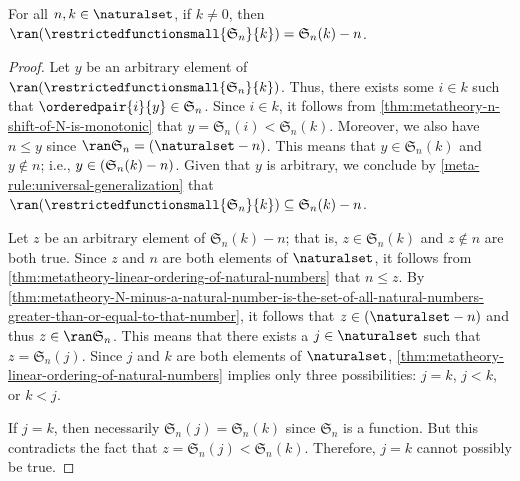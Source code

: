 \begin{thm}
     \label{thm:metatheory-the-range-of-restricted-n-shift}
    For all \( n, k \in \naturalset \), if \( k \neq 0 \), then \( \ran \mleft(  \restrictedfunctionsmall{ \mathfrak{S}_{n} }{k} \mright) = \mathfrak{S}_{n}(k) - n  \).
\end{thm}

\begin{proof}
    Let \( y \) be an arbitrary element of \( \ran \mleft( \restrictedfunctionsmall{ \mathfrak{S}_{n} }{k} \mright) \).
    Thus, there exists some \( i \in k \) such that \( \orderedpair{i}{y} \in \mathfrak{S}_{n} \).
    Since \( i \in k \), it follows from \cref{thm:metatheory-n-shift-of-N-is-monotonic} that \( y = \mathfrak{S}_{n}(i) < \mathfrak{S}_{n}(k)  \).
    Moreover, we also have \( n \leq y \) since \( \ran \mathfrak{S}_{n} = \mleft( \naturalset - n \mright) \).
    This means that \( y \in \mathfrak{S}_{n}(k) \) and \( y \notin n \); i.e., \( y \in \mleft( \mathfrak{S}_{n}(k) - n \mright) \).
    Given that \( y \) is arbitrary, we conclude by \cref{meta-rule:universal-generalization} that
    \( \ran \mleft( \restrictedfunctionsmall{\mathfrak{S}_{n}}{k} \mright) \subseteq \mathfrak{S}_{n}(k) - n \).

    \vspace{0.3cm}
    \noindent
    Let \( z \) be an arbitrary element of \( \mathfrak{S}_{n}(k) - n \); that is, \( z \in \mathfrak{S}_{n}(k) \) and \( z \notin n \)
    are both true.
    Since \( z \) and \( n \) are both elements of \( \naturalset \), it follows from \cref{thm:metatheory-linear-ordering-of-natural-numbers}
    that \( n \leq z \).
    By \cref{thm:metatheory-N-minus-a-natural-number-is-the-set-of-all-natural-numbers-greater-than-or-equal-to-that-number}, it follows
    that \( z \in \mleft( \naturalset - n \mright) \) and thus \( z \in \ran \mathfrak{S}_{n} \).
    This means that there exists a \( j \in \naturalset \) such that \( z = \mathfrak{S}_{n}(j) \).
    Since \( j \) and \( k \) are both elements of \( \naturalset \), \cref{thm:metatheory-linear-ordering-of-natural-numbers} implies only
    three possibilities: \( j = k \), \( j < k \), or \( k < j \).

    \vspace{0.3cm}
    \noindent
    If \( j = k \), then necessarily \( \mathfrak{S}_{n}(j) = \mathfrak{S}_{n}(k) \) since \( \mathfrak{S}_{n} \) is a function.
    But this contradicts the fact that \( z = \mathfrak{S}_{n}(j) < \mathfrak{S}_{n}(k) \).
    Therefore, \( j = k \) cannot possibly be true.


\end{proof}
